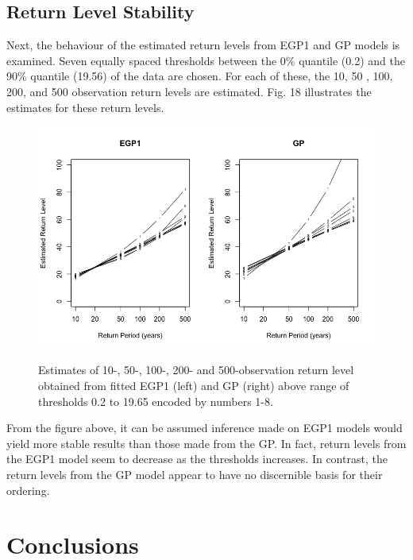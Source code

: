 \documentclass[12pt]{article}
\theoremstyle{definition}
\theoremstyle{definition}
\begin{document}
\subsection{Return Level Stability}
Next, the behaviour of the estimated return levels from EGP1 and GP models is examined. Seven equally spaced thresholds between the 0\% quantile (0.2) and the 90\% quantile (19.56) of the data are chosen. For each of these, the 10, 50 , 100, 200, and 500 observation return levels are estimated. Fig. 18 illustrates the estimates for these return levels. 
\begin{figure}[H]
\begin{center}
{\includegraphics[width=4.in]{project/papafiles/rain.return.png}}
\caption{ Estimates of 10-, 50-, 100-, 200- and 500-observation return level obtained from fitted EGP1 (left) and GP (right) above range of thresholds 0.2 to 19.65 encoded by numbers 1-8. }
\end{center}
\end{figure}
From the figure above, it can be assumed inference made on EGP1 models would yield more stable results than those made from the GP. In fact, return levels from the EGP1 model seem to decrease as the thresholds increases. In contrast, the return levels from the GP model appear to have no discernible basis for their ordering.

\section{Conclusions}

\cite{papatawn}



\end{document}

